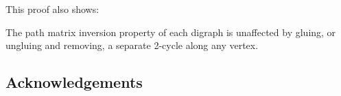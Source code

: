 \documentclass[12pt]{article}
\begin{document}
This proof also shows:
\begin{proposition}\label{Prop:PendantEdge}
  The path matrix inversion property of each digraph is unaffected by gluing, or ungluing and removing,
  a separate 2-cycle along any vertex.
\end{proposition}


\subsection*{Acknowledgements}




\end{document}
